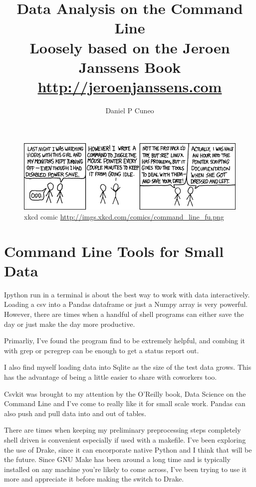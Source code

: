 \documentclass{article}
\title{Data Analysis on the Command Line \\
        \scriptsize{Loosely based on the Jeroen Janssens Book \\
    \url{http://jeroenjanssens.com}}}
\author{Daniel P Cuneo}
\begin{document}
    \maketitle

    \begin{figure}[h!]
        \includegraphics[scale=0.60]{command_line_fu.jpg}
        \caption{xkcd comic \url{http://imgs.xkcd.com/comics/command\_line\_fu.png}}
\end{figure}


    \section{Command Line Tools for Small Data}\label{command-line-tools-for-small-data}

Ipython run in a terminal is about the best way to work with data
interactively. Loading a csv into a Pandas dataframe or just a Numpy
array is very powerful. However, there are times when a handful of shell
programs can either save the day or just make the day more productive.


Primarliy, I've found the program find to be extremely helpful, and
combing it with grep or  pcregrep can be enough to get a status report out.


I also find myself loading data into Sqlite as the size of the
test data grows. This has the advantage of being a little easier to
share with coworkers too.


Csvkit was brought to my attention by the O'Reilly book, Data Science on
the Command Line and I've come to really like it for small scale work.
Pandas can also push and pull data into and out of tables.


There are times when keeping my preliminary preprocessing steps
completely shell driven is convenient especially if used with a
makefile. I've been exploring the use of Drake, since it can encorporate
native Python and I think that will be the future. Since GNU Make has
been around a long time and is typically installed on any machine you're
likely to come across, I've been trying to use it more and appreciate it
before making the switch to Drake.
\end{document}

